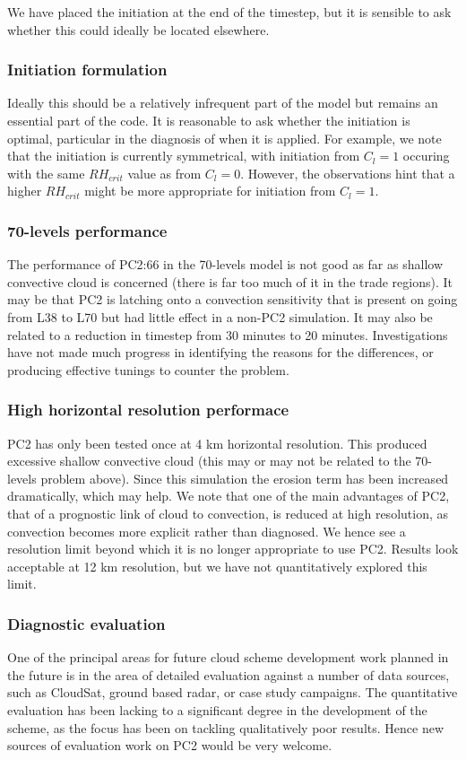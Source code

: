 \documentclass{UMDP_article}
\begin{document}
We have placed the initiation at the end of the timestep, but it is sensible to
ask whether this could ideally be located elsewhere.

\subsubsection{Initiation formulation}
Ideally this should be a relatively infrequent part of the model
but remains an essential part of the code. It is reasonable to ask whether
the initiation is optimal, particular in the diagnosis of when it is
applied. For example, we note that the initiation is currently
symmetrical, with initiation from $C_l=1$ occuring with the same
$RH_{crit}$ value as from $C_l=0$. However, the \cite{wf00}
observations hint that a higher $RH_{crit}$ might be more appropriate
for initiation from $C_l=1$.

\subsubsection{70-levels performance}
The performance of PC2:66 in the 70-levels model is not good as
far as shallow convective cloud is concerned (there is far too
much of it in the trade regions). It may be that PC2 is latching onto
a convection sensitivity that is present on going from L38 to L70 but
had little effect in a non-PC2 simulation. It may also be related
to a reduction in timestep from 30 minutes to 20 minutes.
Investigations have not
made much progress in identifying the reasons for the differences,
or producing effective tunings to counter the problem.

\subsubsection{High horizontal resolution performace}
PC2 has only been tested once at 4 km horizontal resolution. This
produced excessive shallow convective cloud (this may or may not be related
to the 70-levels problem above). Since this simulation the erosion
term has been increased dramatically, which may help. We note that
one of the main advantages of PC2, that of a prognostic link of
cloud to convection, is reduced at high resolution, as convection
becomes more explicit rather than diagnosed. We hence see a
resolution limit beyond which it is no longer appropriate to use
PC2. Results look acceptable at 12 km resolution, but we have not
quantitatively explored this limit.

\subsubsection{Diagnostic evaluation}
One of the principal areas for future cloud scheme development
work planned in the future is in the area of detailed evaluation against
a number of data sources, such as CloudSat, ground based radar,
or case study campaigns. The quantitative evaluation has been
lacking to a significant degree in the development of the scheme,
as the focus has been on tackling qualitatively poor results.
Hence new sources of evaluation work on PC2 would be very welcome.
\end{document}
